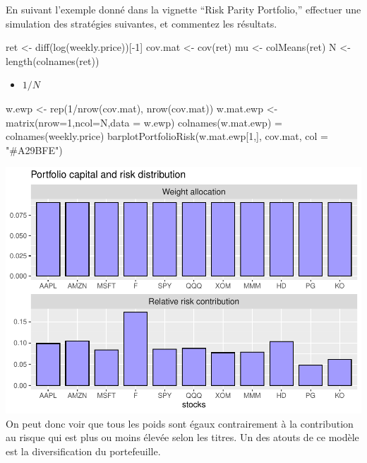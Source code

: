\documentclass[
]{article}
\newenvironment{Shaded}{\begin{snugshade}}{\end{snugshade}}
\newcommand{\AttributeTok}[1]{\textcolor[rgb]{0.77,0.63,0.00}{#1}}
\newcommand{\DecValTok}[1]{\textcolor[rgb]{0.00,0.00,0.81}{#1}}
\newcommand{\FunctionTok}[1]{\textcolor[rgb]{0.00,0.00,0.00}{#1}}
\newcommand{\NormalTok}[1]{#1}
\newcommand{\OtherTok}[1]{\textcolor[rgb]{0.56,0.35,0.01}{#1}}
\newcommand{\SpecialCharTok}[1]{\textcolor[rgb]{0.00,0.00,0.00}{#1}}
\newcommand{\StringTok}[1]{\textcolor[rgb]{0.31,0.60,0.02}{#1}}
\providecommand{\tightlist}{%
  \setlength{\itemsep}{0pt}\setlength{\parskip}{0pt}}
\begin{document}
En suivant l'exemple donné dans la vignette ``Risk Parity Portfolio,''
effectuer une simulation des stratégies suivantes, et commentez les
résultats.

\begin{Shaded}
\begin{Highlighting}[]
\NormalTok{ret }\OtherTok{\textless{}{-}} \FunctionTok{diff}\NormalTok{(}\FunctionTok{log}\NormalTok{(weekly.price))[}\SpecialCharTok{{-}}\DecValTok{1}\NormalTok{]}
\NormalTok{cov.mat }\OtherTok{\textless{}{-}} \FunctionTok{cov}\NormalTok{(ret)}
\NormalTok{mu }\OtherTok{\textless{}{-}} \FunctionTok{colMeans}\NormalTok{(ret)}
\NormalTok{N }\OtherTok{\textless{}{-}} \FunctionTok{length}\NormalTok{(}\FunctionTok{colnames}\NormalTok{(ret))}
\end{Highlighting}
\end{Shaded}

\begin{itemize}
\tightlist
\item
  \(1/N\)
\end{itemize}

\begin{Shaded}
\begin{Highlighting}[]
\NormalTok{w.ewp }\OtherTok{\textless{}{-}} \FunctionTok{rep}\NormalTok{(}\DecValTok{1}\SpecialCharTok{/}\FunctionTok{nrow}\NormalTok{(cov.mat), }\FunctionTok{nrow}\NormalTok{(cov.mat))}
\NormalTok{w.mat.ewp }\OtherTok{\textless{}{-}} \FunctionTok{matrix}\NormalTok{(}\AttributeTok{nrow=}\DecValTok{1}\NormalTok{,}\AttributeTok{ncol=}\NormalTok{N,}\AttributeTok{data =}\NormalTok{ w.ewp)}
\FunctionTok{colnames}\NormalTok{(w.mat.ewp) }\OtherTok{=} \FunctionTok{colnames}\NormalTok{(weekly.price)}
\FunctionTok{barplotPortfolioRisk}\NormalTok{(w.mat.ewp[}\DecValTok{1}\NormalTok{,], cov.mat, }\AttributeTok{col =} \StringTok{"\#A29BFE"}\NormalTok{)}
\end{Highlighting}
\end{Shaded}

\includegraphics{TP-7-v2_files/figure-latex/unnamed-chunk-6-1.pdf} On
peut donc voir que tous les poids sont égaux contrairement à la
contribution au risque qui est plus ou moins élevée selon les titres. Un
des atouts de ce modèle est la diversification du portefeuille.
\end{document}
